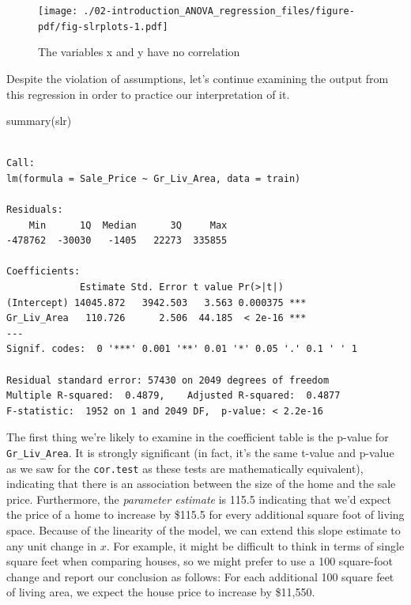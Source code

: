 \documentclass[
  letterpaper,
  DIV=11,
  numbers=noendperiod]{scrreprt}
\newenvironment{Shaded}{\begin{snugshade}}{\end{snugshade}}
\newcommand{\FunctionTok}[1]{\textcolor[rgb]{0.28,0.35,0.67}{#1}}
\newcommand{\NormalTok}[1]{\textcolor[rgb]{0.00,0.23,0.31}{#1}}
\begin{document}
\begin{figure}[H]

{\centering \texttt{[image: ./02-introduction\_ANOVA\_regression\_files/figure-pdf/fig-slrplots-1.pdf]}

}

\caption{\label{fig-slrplots}The variables x and y have no correlation}

\end{figure}

Despite the violation of assumptions, let's continue examining the
output from this regression in order to practice our interpretation of
it.

\begin{Shaded}
\begin{Highlighting}[]
\FunctionTok{summary}\NormalTok{(slr)}
\end{Highlighting}
\end{Shaded}

\begin{verbatim}

Call:
lm(formula = Sale_Price ~ Gr_Liv_Area, data = train)

Residuals:
    Min      1Q  Median      3Q     Max 
-478762  -30030   -1405   22273  335855 

Coefficients:
             Estimate Std. Error t value Pr(>|t|)    
(Intercept) 14045.872   3942.503   3.563 0.000375 ***
Gr_Liv_Area   110.726      2.506  44.185  < 2e-16 ***
---
Signif. codes:  0 '***' 0.001 '**' 0.01 '*' 0.05 '.' 0.1 ' ' 1

Residual standard error: 57430 on 2049 degrees of freedom
Multiple R-squared:  0.4879,    Adjusted R-squared:  0.4877 
F-statistic:  1952 on 1 and 2049 DF,  p-value: < 2.2e-16
\end{verbatim}

The first thing we're likely to examine in the coefficient table is the
p-value for \texttt{Gr\_Liv\_Area}. It is strongly significant (in fact,
it's the same t-value and p-value as we saw for the \texttt{cor.test} as
these tests are mathematically equivalent), indicating that there is an
association between the size of the home and the sale price.
Furthermore, the \emph{parameter estimate} is 115.5 indicating that we'd
expect the price of a home to increase by \$115.5 for every additional
square foot of living space. Because of the linearity of the model, we
can extend this slope estimate to any unit change in \(x\). For example,
it might be difficult to think in terms of single square feet when
comparing houses, so we might prefer to use a 100 square-foot change and
report our conclusion as follows: For each additional 100 square feet of
living area, we expect the house price to increase by \$11,550.
\end{document}
